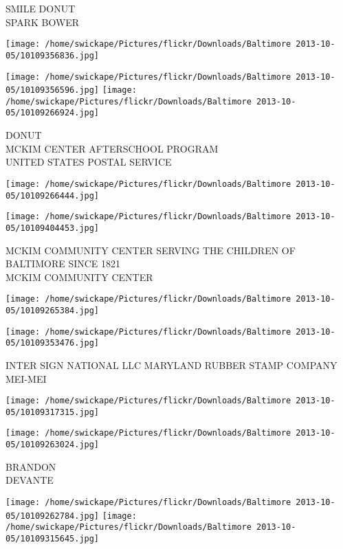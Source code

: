 \documentclass[10pt,letterpaper]{article}
\begin{document}
SMILE DONUT\\
SPARK BOWER\\
\pagebreak

\texttt{[image: /home/swickape/Pictures/flickr/Downloads/Baltimore 2013-10-05/10109356836.jpg]}

\vspace{0.25in}
\texttt{[image: /home/swickape/Pictures/flickr/Downloads/Baltimore 2013-10-05/10109356596.jpg]}
\texttt{[image: /home/swickape/Pictures/flickr/Downloads/Baltimore 2013-10-05/10109266924.jpg]}

DONUT\\
MCKIM CENTER AFTERSCHOOL PROGRAM\\
UNITED STATES POSTAL SERVICE\\
\pagebreak

\texttt{[image: /home/swickape/Pictures/flickr/Downloads/Baltimore 2013-10-05/10109266444.jpg]}

\vspace{0.25in}
\texttt{[image: /home/swickape/Pictures/flickr/Downloads/Baltimore 2013-10-05/10109404453.jpg]}

MCKIM COMMUNITY CENTER SERVING THE CHILDREN OF BALTIMORE SINCE 1821\\
MCKIM COMMUNITY CENTER\\
\pagebreak

\texttt{[image: /home/swickape/Pictures/flickr/Downloads/Baltimore 2013-10-05/10109265384.jpg]}

\vspace{0.25in}
\texttt{[image: /home/swickape/Pictures/flickr/Downloads/Baltimore 2013-10-05/10109353476.jpg]}

INTER SIGN NATIONAL LLC MARYLAND RUBBER STAMP COMPANY\\
MEI{-}MEI\\
\pagebreak

\texttt{[image: /home/swickape/Pictures/flickr/Downloads/Baltimore 2013-10-05/10109317315.jpg]}

\vspace{0.25in}
\texttt{[image: /home/swickape/Pictures/flickr/Downloads/Baltimore 2013-10-05/10109263024.jpg]}

BRANDON\\
DEVANTE\\
\pagebreak

\texttt{[image: /home/swickape/Pictures/flickr/Downloads/Baltimore 2013-10-05/10109262784.jpg]}
\texttt{[image: /home/swickape/Pictures/flickr/Downloads/Baltimore 2013-10-05/10109315645.jpg]}
\end{document}
